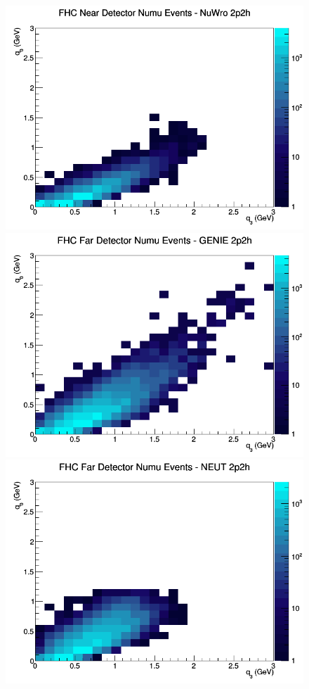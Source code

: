 \begin{figure}[h]
\includegraphics[width=\linewidth]{eff_q0_q3/LAr/2p2h_FHC_ND_numu_q3_q0_NuWro.png}
\endminipage
\newline
{}
\includegraphics[width=\linewidth]{eff_q0_q3/LAr/2p2h_FHC_FD_numu_q3_q0_GENIE.png}
\endminipage
{}
\includegraphics[width=\linewidth]{eff_q0_q3/LAr/2p2h_FHC_FD_numu_q3_q0_NEUT.png}

\end{figure}
